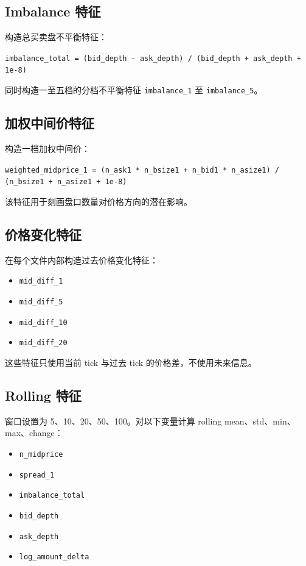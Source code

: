 \documentclass[UTF8,a4paper,12pt]{ctexart}
\begin{document}
\subsection{Imbalance 特征}

构造总买卖盘不平衡特征：

\begin{center}
\texttt{imbalance\_total = (bid\_depth - ask\_depth) / (bid\_depth + ask\_depth + 1e-8)}
\end{center}

同时构造一至五档的分档不平衡特征 \texttt{imbalance\_1} 至 \texttt{imbalance\_5}。

\subsection{加权中间价特征}

构造一档加权中间价：

\begin{center}
\texttt{weighted\_midprice\_1 = (n\_ask1 * n\_bsize1 + n\_bid1 * n\_asize1) / (n\_bsize1 + n\_asize1 + 1e-8)}
\end{center}

该特征用于刻画盘口数量对价格方向的潜在影响。

\subsection{价格变化特征}

在每个文件内部构造过去价格变化特征：

\begin{itemize}
  \item \texttt{mid\_diff\_1}
  \item \texttt{mid\_diff\_5}
  \item \texttt{mid\_diff\_10}
  \item \texttt{mid\_diff\_20}
\end{itemize}

这些特征只使用当前 tick 与过去 tick 的价格差，不使用未来信息。

\subsection{Rolling 特征}

窗口设置为 5、10、20、50、100。对以下变量计算 rolling mean、std、min、max、change：

\begin{itemize}
  \item \texttt{n\_midprice}
  \item \texttt{spread\_1}
  \item \texttt{imbalance\_total}
  \item \texttt{bid\_depth}
  \item \texttt{ask\_depth}
  \item \texttt{log\_amount\_delta}
\end{itemize}
\end{document}
